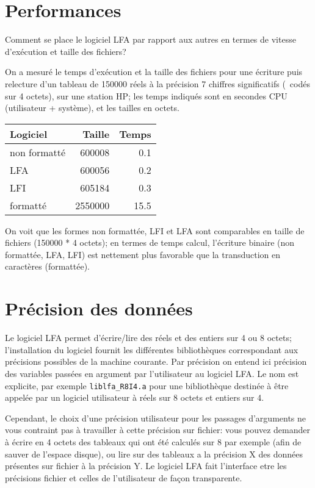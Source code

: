 \documentclass[10pt,french]{book}
\begin{document}
\section*{Performances}

\p Comment se place le logiciel LFA par rapport 
aux autres en termes de vitesse d'exécution et
taille des fichiers?

\p On a mesuré
le temps d'exécution et la taille
des fichiers
pour une écriture puis relecture d'un tableau
de 150000 réels à la précision 7 chiffres significatifs
(\ie\ codés sur 4 octets),
sur une station HP; les temps indiqués sont en secondes CPU
(utilisateur + système), et les tailles en octets.

\p \begin{tabular}{|l|r|r|}\hline 
	Logiciel & Taille & Temps \\ \hline
	non formatté & 600008 & 0.1 \\
	LFA & 600056 & 0.2 \\
	LFI & 605184 & 0.3 \\
	formatté & 2550000 & 15.5 \\
	\hline
\end{tabular}

\p On voit que les formes non formattée, LFI et LFA sont comparables
en taille de fichiers (150000 * 4 octets); en termes de temps calcul, l'écriture
binaire (non formattée, LFA, LFI) est nettement plus favorable que la
transduction en caractères (formattée).

\section*{Précision des données}

\p Le logiciel LFA permet d'écrire/lire des réels
et des entiers sur 4 ou 8 octets;
l'installation du logiciel fournit
les différentes bibliothèques correspondant
aux précisions possibles de la machine
courante.
Par précision on entend ici précision des variables
passées en argument par l'utilisateur au logiciel LFA.
Le nom est explicite, par exemple {\tt liblfa\_R8I4.a} 
pour une bibliothèque
destinée à être appelée par un logiciel utilisateur
à réels sur 8 octets et entiers sur 4.

\p Cependant, le choix d'une précision utilisateur pour
les passages d'arguments ne vous contraint
pas à travailler à cette précision
sur fichier: 
vous pouvez demander à écrire
en 4 octets des tableaux qui ont été calculés sur 8
par exemple (afin de sauver de l'espace disque), ou 
lire sur des tableaux a la précision X des données présentes
sur fichier à la précision Y. Le logiciel LFA fait
l'interface etre les précisions fichier et celles de l'utilisateur
de façon transparente. 
\end{document}
